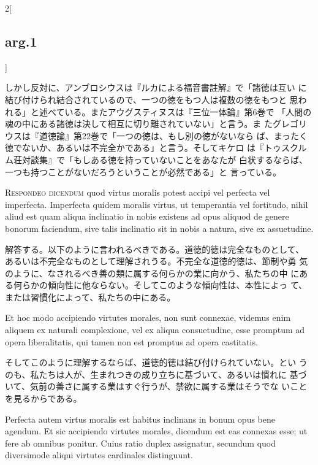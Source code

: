 \documentclass[paper=a4paper,fontsize=10pt,jafontsize=9pt,titlepage]{jlreq}
\begin{document}
\begin{paracol}{2}[\subsection{arg.1}]
\switchcolumn

しかし反対に、アンブロシウスは『ルカによる福音書註解』で「諸徳は互い
 に結び付けられ結合されているので、一つの徳をもつ人は複数の徳をもつと
 思われる」と述べている。またアウグスティヌスは『三位一体論』第6巻で
 「人間の魂の中にある諸徳は決して相互に切り離されていない」と言う。ま
 たグレゴリウスは『道徳論』第22巻で「一つの徳は、もし別の徳がないなら
 ば、まったく徳でないか、あるいは不完全かである」と言う。そしてキケロ
 は『トゥスクルム荘対談集』で「もしある徳を持っていないことをあなたが
 白状するならば、一つも持つことがないだろうということが必然である」と
 言っている。


{\scshape Respondeo dicendum} quod virtus moralis potest accipi vel
perfecta vel imperfecta. Imperfecta quidem moralis virtus, ut
temperantia vel fortitudo, nihil aliud est quam aliqua inclinatio in
nobis existens ad opus aliquod de genere bonorum faciendum, sive talis
 inclinatio sit in nobis a natura, sive ex assuetudine.

\switchcolumn

解答する。以下のように言われるべきである。道徳的徳は完全なものとして、
 あるいは不完全なものとして理解されうる。不完全な道徳的徳は、節制や勇
 気のように、なされるべき善の類に属する何らかの業に向かう、私たちの中
 にある何らかの傾向性に他ならない。そしてこのような傾向性は、本性によっ
 て、または習慣化によって、私たちの中にある。

\switchcolumn*

Et hoc modo accipiendo virtutes morales, non sunt connexae, videmus
enim aliquem ex naturali complexione, vel ex aliqua consuetudine, esse
promptum ad opera liberalitatis, qui tamen non est promptus ad opera
castitatis.

\switchcolumn

そしてこのように理解するならば、道徳的徳は結び付けられていない。とい
 うのも、私たちは人が、生まれつきの成り立ちに基づいて、あるいは慣れに
 基づいて、気前の善さに属する業はすぐ行うが、禁欲に属する業はそうでな
 いことを見るからである。

\switchcolumn*

Perfecta autem virtus moralis est habitus inclinans in bonum opus
 bene agendum. Et sic accipiendo virtutes morales, dicendum est eas
 connexas esse; ut fere ab omnibus ponitur. Cuius ratio duplex
 assignatur, secundum quod diversimode aliqui virtutes cardinales
 distinguunt.


\end{paracol}
\end{document}
